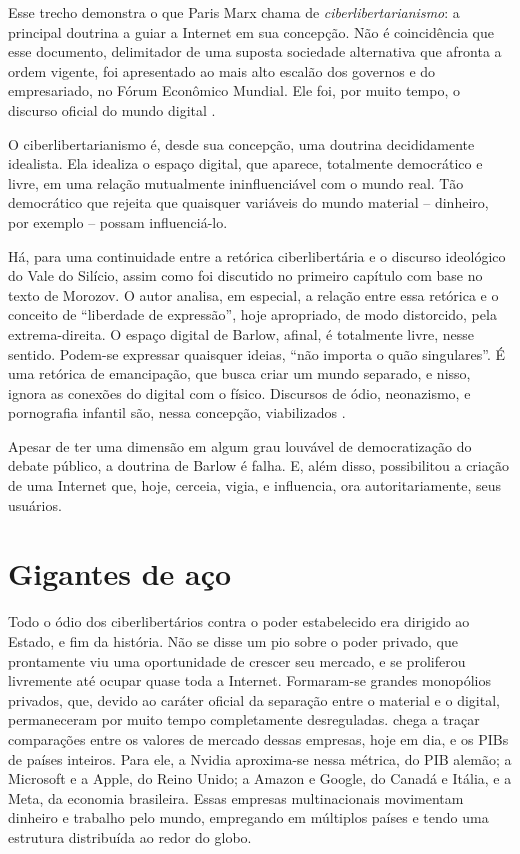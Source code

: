 Esse trecho demonstra o que Paris Marx chama de \textit{ciberlibertarianismo}: a principal doutrina a guiar a Internet em sua concepção.
Não é coincidência que esse documento, delimitador de uma suposta sociedade alternativa que afronta a ordem vigente, foi apresentado ao mais alto escalão dos governos e do empresariado, no Fórum Econômico Mundial.
Ele foi, por muito tempo, o discurso oficial do mundo digital \cite{marx_pavel_2025}.

O ciberlibertarianismo é, desde sua concepção, uma doutrina decididamente idealista.
Ela idealiza o espaço digital, que aparece, totalmente democrático e livre, em uma relação mutualmente ininfluenciável com o mundo real.
Tão democrático que rejeita que quaisquer variáveis do mundo material -- dinheiro, por exemplo -- possam influenciá-lo.

Há, para \textcite{marx_pavel_2025} uma continuidade entre a retórica ciberlibertária e o discurso ideológico do Vale do Silício, assim como foi discutido no primeiro capítulo com base no texto de Morozov.
O autor analisa, em especial, a relação entre essa retórica e o conceito de ``liberdade de expressão'', hoje apropriado, de modo distorcido, pela extrema-direita.
O espaço digital de Barlow, afinal, é totalmente livre, nesse sentido.
Podem-se expressar quaisquer ideias, ``não importa o quão singulares''.
É uma retórica de emancipação, que busca criar um mundo separado, e nisso, ignora as conexões do digital com o físico.
Discursos de ódio, neonazismo, e pornografia infantil são, nessa concepção, viabilizados \cite{morozov_big_2018}.

Apesar de ter uma dimensão em algum grau louvável de democratização do debate público, a doutrina de Barlow é falha.
E, além disso, possibilitou a criação de uma Internet que, hoje, cerceia, vigia, e influencia, ora autoritariamente, seus usuários.

\section{Gigantes de aço}
Todo o ódio dos ciberlibertários contra o poder estabelecido era dirigido ao Estado, e fim da história.
Não se disse um pio sobre o poder privado, que prontamente viu uma oportunidade de crescer seu mercado, e se proliferou livremente até ocupar quase toda a Internet.
Formaram-se grandes monopólios privados, que, devido ao caráter oficial da separação entre o material e o digital, permaneceram por muito tempo completamente desreguladas.
\textcite{nunes_coase_2025} chega a traçar comparações entre os valores de mercado dessas empresas, hoje em dia, e os PIBs de países inteiros.
Para ele, a Nvidia aproxima-se nessa métrica, do PIB alemão; a Microsoft e a Apple, do Reino Unido; a Amazon e Google, do Canadá e Itália, e a Meta, da economia brasileira.
Essas empresas multinacionais movimentam dinheiro e trabalho pelo mundo, empregando em múltiplos países e tendo uma estrutura distribuída ao redor do globo.

